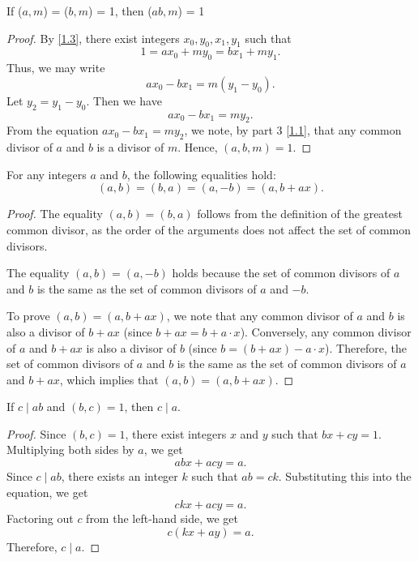 \documentclass[11pt]{article}
\begin{document}
\begin{theorem}\label{1.8}
    If (\(a, m\)) = (\(b, m\)) = 1, then (\(ab, m\)) = 1
\end{theorem}
\begin{proof}
    By \cref{1.3}, there exist integers \(x_0, y_0, x_1, y_1\) such that
    \[1 = ax_0 + my_0 = bx_1 + my_1.\]
    Thus, we may write
    \[
        a x_0 - b x_1 = m (y_1 - y_0).
    \]
    Let \(y_2 = y_1 - y_0\). Then we have
    \[
        a x_0 - b x_1 = m y_2.
    \]
    From the equation \(a x_0 - b x_1 = m y_2\), we note, by part 3 \cref{1.1},
    that any common divisor of \(a\) and \(b\) is a divisor of \(m\). Hence, \((a,
    b, m) = 1\).
\end{proof}
\begin{theorem}\label{1.9}
    For any integers \(a\) and \(b\), the following equalities hold:
    \[
        (a, b) = (b, a) = (a, -b) = (a, b + ax).
    \]
\end{theorem}
\begin{proof}
    The equality \((a, b) = (b, a)\) follows from the definition of the greatest common divisor, as the order of the arguments does not affect the set of common divisors.

    The equality \((a, b) = (a, -b)\) holds because the set of common divisors of
    \(a\) and \(b\) is the same as the set of common divisors of \(a\) and \(-b\).

    To prove \((a, b) = (a, b + ax)\), we note that any common divisor of \(a\) and
    \(b\) is also a divisor of \(b + ax\) (since \(b + ax = b + a \cdot x\)).
    Conversely, any common divisor of \(a\) and \(b + ax\) is also a divisor of
    \(b\) (since \(b = (b + ax) - a \cdot x\)). Therefore, the set of common
    divisors of \(a\) and \(b\) is the same as the set of common divisors of \(a\)
    and \(b + ax\), which implies that \((a, b) = (a, b + ax)\).
\end{proof}
\begin{theorem}\label{1.10}
    If \(c \mid ab\) and \((b, c) = 1\), then \(c \mid a\).
\end{theorem}

\begin{proof}
    Since \((b, c) = 1\), there exist integers \(x\) and \(y\) such that \(bx + cy = 1\). Multiplying both sides by \(a\), we get
    \[
        abx + acy = a.
    \]
    Since \(c \mid ab\), there exists an integer \(k\) such that \(ab = ck\).
    Substituting this into the equation, we get
    \[
        ckx + acy = a.
    \]
    Factoring out \(c\) from the left-hand side, we get
    \[
        c(kx + ay) = a.
    \]
    Therefore, \(c \mid a\).
\end{proof}
\end{document}
